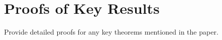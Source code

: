 \appendix
\section{Proofs of Key Results}
Provide detailed proofs for any key theorems mentioned in the paper.